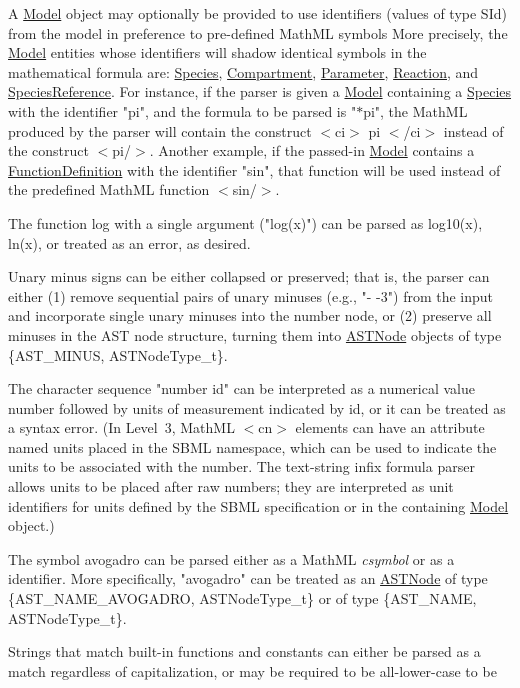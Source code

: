 \begin{DoxyItemize}
\item A \hyperlink{class_model}{Model} object may optionally be provided to use identifiers (values of type {\ttfamily S\+Id}) from the model in preference to pre-\/defined Math\+ML symbols More precisely, the \hyperlink{class_model}{Model} entities whose identifiers will shadow identical symbols in the mathematical formula are\+: \hyperlink{class_species}{Species}, \hyperlink{class_compartment}{Compartment}, \hyperlink{class_parameter}{Parameter}, \hyperlink{class_reaction}{Reaction}, and \hyperlink{class_species_reference}{Species\+Reference}. For instance, if the parser is given a \hyperlink{class_model}{Model} containing a \hyperlink{class_species}{Species} with the identifier "{\ttfamily pi}", and the formula to be parsed is "{$\ast$pi}", the Math\+ML produced by the parser will contain the construct {\ttfamily $<$ci$>$ pi $<$/ci$>$} instead of the construct {\ttfamily $<$pi/$>$}. Another example, if the passed-\/in \hyperlink{class_model}{Model} contains a \hyperlink{class_function_definition}{Function\+Definition} with the identifier "{\ttfamily sin}", that function will be used instead of the predefined Math\+ML function {\ttfamily $<$sin/$>$}. \item The function {\ttfamily log} with a single argument ("{\ttfamily log(x)}") can be parsed as {\ttfamily log10(x)}, {\ttfamily ln(x)}, or treated as an error, as desired. \item Unary minus signs can be either collapsed or preserved; that is, the parser can either (1) remove sequential pairs of unary minuses (e.\+g., "{\ttfamily -\/ -\/3}") from the input and incorporate single unary minuses into the number node, or (2) preserve all minuses in the A\+ST node structure, turning them into \hyperlink{class_a_s_t_node}{A\+S\+T\+Node} objects of type \{A\+S\+T\+\_\+\+M\+I\+N\+US, A\+S\+T\+Node\+Type\+\_\+t\}. \item The character sequence "{\ttfamily number id}" can be interpreted as a numerical value {\ttfamily number} followed by units of measurement indicated by {\ttfamily id}, or it can be treated as a syntax error. (In Level~3, Math\+ML {\ttfamily $<$cn$>$} elements can have an attribute named {\ttfamily units} placed in the S\+B\+ML namespace, which can be used to indicate the units to be associated with the number. The text-\/string infix formula parser allows units to be placed after raw numbers; they are interpreted as unit identifiers for units defined by the S\+B\+ML specification or in the containing \hyperlink{class_model}{Model} object.) \item The symbol {\ttfamily avogadro} can be parsed either as a Math\+ML {\itshape csymbol} or as a identifier. More specifically, "{\ttfamily avogadro}" can be treated as an \hyperlink{class_a_s_t_node}{A\+S\+T\+Node} of type \{A\+S\+T\+\_\+\+N\+A\+M\+E\+\_\+\+A\+V\+O\+G\+A\+D\+RO, A\+S\+T\+Node\+Type\+\_\+t\} or of type \{A\+S\+T\+\_\+\+N\+A\+ME, A\+S\+T\+Node\+Type\+\_\+t\}. \item Strings that match built-\/in functions and constants can either be parsed as a match regardless of capitalization, or may be required to be all-\/lower-\/case to be 
\end{DoxyItemize}
